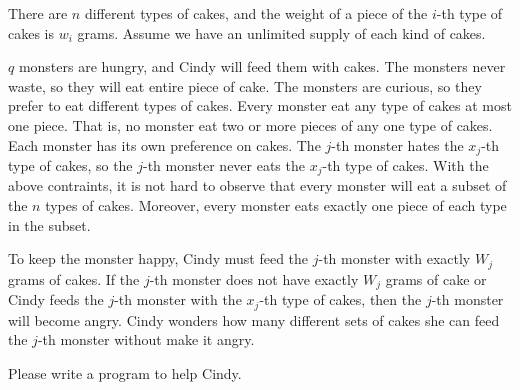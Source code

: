 There are $n$ different types of cakes, 
and the weight of a piece of the $i$-th type of cakes is $w_i$ grams.
Assume we have an unlimited supply of each kind of cakes.

$q$ monsters are hungry, and Cindy will feed them with cakes.
The monsters never waste, so they will eat entire piece of cake.
The monsters are curious, so they prefer to eat different types of cakes. 
Every monster eat any type of cakes at most one piece. 
That is, no monster eat two or more pieces of any one type of cakes.
Each monster has its own preference on cakes.
The $j$-th monster hates the $x_j$-th type of cakes, so
the $j$-th monster never eats the $x_j$-th type of cakes.
With the above contraints, it is not hard to observe that every monster will 
eat a subset of the $n$ types of cakes. Moreover, every monster eats exactly
one piece of each type in the subset. 

To keep the monster happy, Cindy must feed the $j$-th monster with 
exactly $W_j$ grams of cakes. If the $j$-th monster does not have exactly $W_j$
grams of cake or Cindy feeds the $j$-th monster with the $x_j$-th type of cakes,
then the $j$-th monster will become angry.
Cindy wonders how many different sets of cakes she can feed the $j$-th monster 
without make it angry.

Please write a program to help Cindy.
